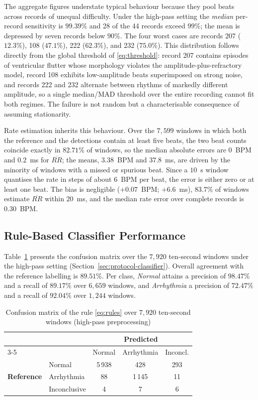 \documentclass[conference]{IEEEtran}
\begin{document}
The aggregate figures understate typical behaviour because they pool beats across records of unequal difficulty. Under the high-pass setting the \emph{median} per-record sensitivity is $99.39\%$ and 28 of the 44 records exceed $99\%$; the mean is depressed by seven records below $90\%$. The four worst cases are records 207 ($12.3\%$), 108 ($47.1\%$), 222 ($62.3\%$), and 232 ($75.0\%$). This distribution follows directly from the global threshold of \eqref{eq:threshold}: record 207 contains episodes of ventricular flutter whose morphology violates the amplitude-plus-refractory model, record 108 exhibits low-amplitude beats superimposed on strong noise, and records 222 and 232 alternate between rhythms of markedly different amplitude, so a single median/MAD threshold over the entire recording cannot fit both regimes. The failure is not random but a characterisable consequence of assuming stationarity.

Rate estimation inherits this behaviour. Over the $7{,}599$ windows in which both the reference and the detections contain at least five beats, the two beat counts coincide exactly in $82.71\%$ of windows, so the median absolute errors are $0$~BPM and $0.2$~ms for $\overline{RR}$; the means, $3.38$~BPM and $37.8$~ms, are driven by the minority of windows with a missed or spurious beat. Since a $10$~s window quantises the rate in steps of about $6$~BPM per beat, the error is either zero or at least one beat. The bias is negligible ($+0.07$~BPM; $+6.6$~ms), $83.7\%$ of windows estimate $\overline{RR}$ within $20$~ms, and the median rate error over complete records is $0.30$~BPM.

\subsection{Rule-Based Classifier Performance}
\label{sec:results-classifier}

Table~\ref{tab:confusion} presents the confusion matrix over the $7{,}920$ ten-second windows under the high-pass setting (Section~\ref{sec:protocol-classifier}). Overall agreement with the reference labelling is $89.51\%$. Per class, \emph{Normal} attains a precision of $98.47\%$ and a recall of $89.17\%$ over $6{,}659$ windows, and \emph{Arrhythmia} a precision of $72.47\%$ and a recall of $92.04\%$ over $1{,}244$ windows.

\begin{table}[!t]
\caption{Confusion matrix of the rule \eqref{eq:rules} over $7{,}920$ ten-second windows (high-pass preprocessing)}
\centering
\renewcommand{\arraystretch}{1.2}
\setlength{\tabcolsep}{4pt}
\begin{tabular}{llccc}
\toprule
& & \multicolumn{3}{c}{\textbf{Predicted}}\\
\cmidrule(l){3-5}
& & Normal & Arrhythmia & Inconcl.\\
\midrule
\multirow{3}{*}{\textbf{Reference}}
& Normal       & 5\,938 & 428   & 293\\
& Arrhythmia   & 88     & 1\,145 & 11\\
& Inconclusive & 4      & 7     & 6\\
\bottomrule
\end{tabular}
\label{tab:confusion}
\end{table}
\end{document}
